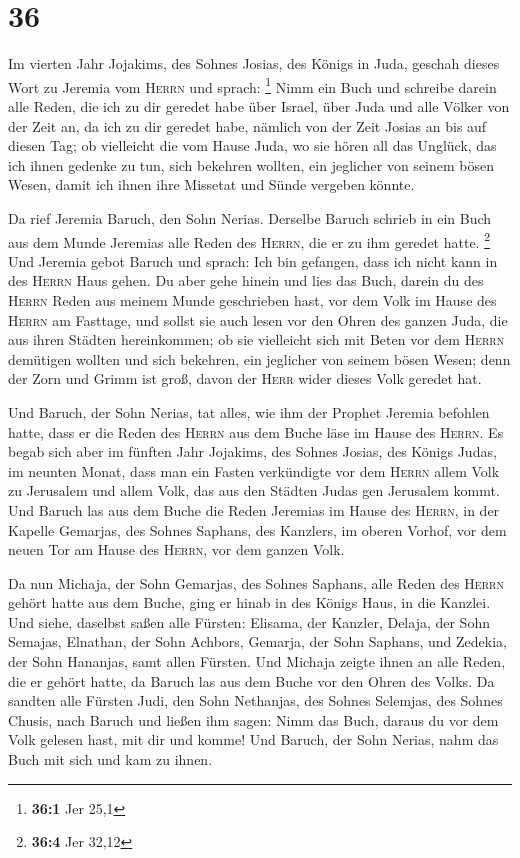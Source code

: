 \hypertarget{section-35}{%
\section{36}\label{section-35}}

 Im vierten Jahr Jojakims, des Sohnes Josias, des Königs
in Juda, geschah dieses Wort zu Jeremia vom \textsc{Herrn} und sprach:
\footnote{\textbf{36:1} Jer 25,1}  Nimm ein Buch und
schreibe darein alle Reden, die ich zu dir geredet habe über Israel,
über Juda und alle Völker von der Zeit an, da ich zu dir geredet habe,
nämlich von der Zeit Josias an bis auf diesen Tag;  ob
vielleicht die vom Hause Juda, wo sie hören all das Unglück, das ich
ihnen gedenke zu tun, sich bekehren wollten, ein jeglicher von seinem
bösen Wesen, damit ich ihnen ihre Missetat und Sünde vergeben könnte.

 Da rief Jeremia Baruch, den Sohn Nerias. Derselbe Baruch
schrieb in ein Buch aus dem Munde Jeremias alle Reden des
\textsc{Herrn}, die er zu ihm geredet hatte. \footnote{\textbf{36:4} Jer
  32,12}  Und Jeremia gebot Baruch und sprach: Ich bin
gefangen, dass ich nicht kann in des \textsc{Herrn} Haus gehen.
 Du aber gehe hinein und lies das Buch, darein du des
\textsc{Herrn} Reden aus meinem Munde geschrieben hast, vor dem Volk im
Hause des \textsc{Herrn} am Fasttage, und sollst sie auch lesen vor den
Ohren des ganzen Juda, die aus ihren Städten hereinkommen;
 ob sie vielleicht sich mit Beten vor dem \textsc{Herrn}
demütigen wollten und sich bekehren, ein jeglicher von seinem bösen
Wesen; denn der Zorn und Grimm ist groß, davon der \textsc{Herr} wider
dieses Volk geredet hat.

 Und Baruch, der Sohn Nerias, tat alles, wie ihm der
Prophet Jeremia befohlen hatte, dass er die Reden des \textsc{Herrn} aus
dem Buche läse im Hause des \textsc{Herrn}.  Es begab sich
aber im fünften Jahr Jojakims, des Sohnes Josias, des Königs Judas, im
neunten Monat, dass man ein Fasten verkündigte vor dem \textsc{Herrn}
allem Volk zu Jerusalem und allem Volk, das aus den Städten Judas gen
Jerusalem kommt.  Und Baruch las aus dem Buche die Reden
Jeremias im Hause des \textsc{Herrn}, in der Kapelle Gemarjas, des
Sohnes Saphans, des Kanzlers, im oberen Vorhof, vor dem neuen Tor am
Hause des \textsc{Herrn}, vor dem ganzen Volk.

 Da nun Michaja, der Sohn Gemarjas, des Sohnes Saphans,
alle Reden des \textsc{Herrn} gehört hatte aus dem Buche,
 ging er hinab in des Königs Haus, in die Kanzlei. Und
siehe, daselbst saßen alle Fürsten: Elisama, der Kanzler, Delaja, der
Sohn Semajas, Elnathan, der Sohn Achbors, Gemarja, der Sohn Saphans, und
Zedekia, der Sohn Hananjas, samt allen Fürsten.  Und
Michaja zeigte ihnen an alle Reden, die er gehört hatte, da Baruch las
aus dem Buche vor den Ohren des Volks.  Da sandten alle
Fürsten Judi, den Sohn Nethanjas, des Sohnes Selemjas, des Sohnes
Chusis, nach Baruch und ließen ihm sagen: Nimm das Buch, daraus du vor
dem Volk gelesen hast, mit dir und komme! Und Baruch, der Sohn Nerias,
nahm das Buch mit sich und kam zu ihnen.


